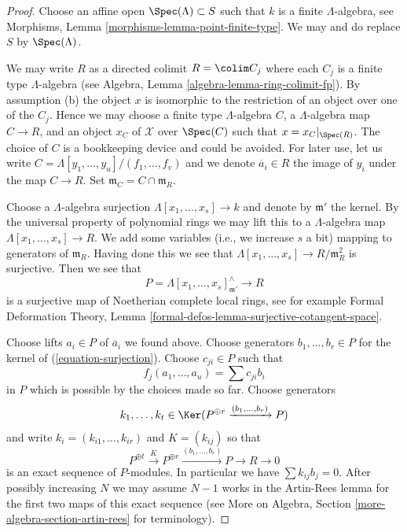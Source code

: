 \begin{proof}
Choose an affine open $\Spec(\Lambda) \subset S$ such that $k$ is a finite
$\Lambda$-algebra, see
Morphisms, Lemma \ref{morphisms-lemma-point-finite-type}.
We may and do replace $S$ by $\Spec(\Lambda)$.

\medskip\noindent
We may write $R$ as a directed colimit $R = \colim C_j$ where each
$C_j$ is a finite type $\Lambda$-algebra (see
Algebra, Lemma \ref{algebra-lemma-ring-colimit-fp}).
By assumption (b) the object $x$ is isomorphic to the restriction of
an object over one of the $C_j$. Hence we may choose a finite type
$\Lambda$-algebra $C$, a $\Lambda$-algebra map $C \to R$, and an object
$x_C$ of $\mathcal{X}$ over $\Spec(C)$ such that $x = x_C|_{\Spec(R)}$.
The choice of $C$ is a bookkeeping device and could be avoided.
For later use, let us write $C = \Lambda[y_1, \ldots, y_u]/(f_1, \ldots, f_v)$
and we denote $\overline{a}_i \in R$ the image of $y_i$ under the
map $C \to R$. Set $\mathfrak m_C = C \cap \mathfrak m_R$.

\medskip\noindent
Choose a $\Lambda$-algebra surjection $\Lambda[x_1, \ldots, x_s] \to k$
and denote by $\mathfrak m'$ the kernel.
By the universal property of polynomial rings we may lift this
to a $\Lambda$-algebra map $\Lambda[x_1, \ldots, x_s] \to R$.
We add some variables (i.e., we increase $s$ a bit) mapping to generators
of $\mathfrak m_R$. Having done this we see that
$\Lambda[x_1, \ldots, x_s] \to R/\mathfrak m_R^2$ is surjective.
Then we see that
\begin{equation}
\label{equation-surjection}
P = \Lambda[x_1, \ldots, x_s]_{\mathfrak m'}^\wedge \longrightarrow R
\end{equation}
is a surjective map of Noetherian complete local rings, see for example
Formal Deformation Theory, Lemma
\ref{formal-defos-lemma-surjective-cotangent-space}.

\medskip\noindent
Choose lifts $a_i \in P$ of $\overline{a}_i$ we found above.
Choose generators $b_1, \ldots, b_r \in P$ for the kernel of
(\ref{equation-surjection}).
Choose $c_{ji} \in P$ such that
$$
f_j(a_1, \ldots, a_u) = \sum c_{ji} b_i
$$
in $P$ which is possible by the choices made so far. Choose generators
$$
k_1, \ldots, k_t \in
\Ker(P^{\oplus r} \xrightarrow{(b_1, \ldots, b_r)} P)
$$
and write $k_i = (k_{i1}, \ldots, k_{ir})$ and $K = (k_{ij})$
so that
$$
P^{\oplus t} \xrightarrow{K}
P^{\oplus r} \xrightarrow{(b_1, \ldots, b_r)}
P \to R \to 0
$$
is an exact sequence of $P$-modules. In particular we have
$\sum k_{ij} b_j = 0$. After possibly increasing $N$ we may
assume $N - 1$ works in the Artin-Rees lemma for the first two maps of this
exact sequence (see More on Algebra, Section
\ref{more-algebra-section-artin-rees} for terminology).


\end{proof}

